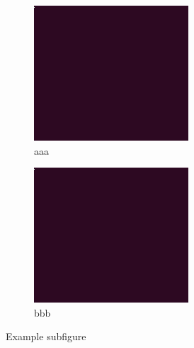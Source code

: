\documentclass[11pt]{article}
\begin{document}
\begin{figure}
    \centering
    \begin{subfigure}[b]{0.3\textwidth}
        \centering
        \includegraphics[width=\textwidth]{example-image.png}
        \caption{aaa}
        \label{fig:subfig1}
    \end{subfigure}
    \hfill
    \begin{subfigure}[b]{0.3\textwidth}
        \centering
        \includegraphics[width=\textwidth]{example-image.png}
        \caption{bbb}
        \label{fig:subfig2}
    \end{subfigure}
    \caption{Example subfigure}
    \label{fig:subfig}
\end{figure}
\end{document}
